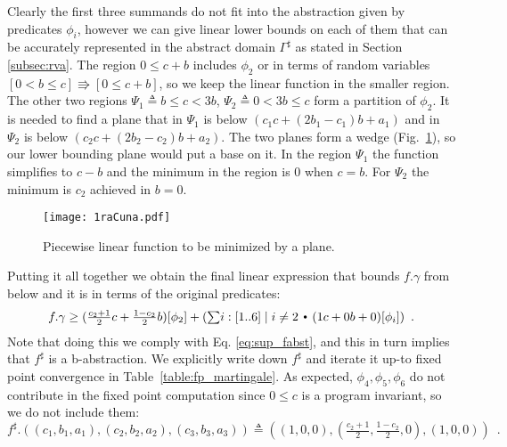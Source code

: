 \documentclass{eptcs}
\theoremstyle{plain}
\theoremstyle{definition}
\newcommand{\Def}{\ensuremath{\triangleq}}
\newcommand{\dotsep}{\mbox{\raisebox{0.4ex}{\tiny\ensuremath{\:\;\bullet\;\:}}}}
\newcommand{\elq}{\ensuremath{\Rrightarrow}}
\begin{document}
Clearly the first three summands do not fit into the abstraction given by predicates $\phi_i$,
however we can give linear lower bounds on each of them that can be accurately represented in the abstract domain $\Gamma^\sharp$ as stated in Section \ref{subsec:rva}.
The region $0\leq c+b$ includes $\phi_2$ or in terms of random variables $[0<b\leq c] \elq [0\leq c+b]$, so we keep the linear function in the smaller region.
The other two regions $\Psi_1 \Def b\leq c<3b$, $\Psi_2 \Def 0<3b\leq c$ form a partition of $\phi_2$.
It is needed to find a plane that in $\Psi_1$ is below $(c_1 c+(2b_1-c_1)b+a_1)$ and in $\Psi_2$ is below $(c_2 c+(2b_2-c_2)b+a_2)$.
The two planes form a wedge (Fig.~\ref{fig:cuna}), so our lower bounding plane would put a base on it.
In the region $\Psi_1$ the function simplifies to $c-b$ and the minimum in the region is $0$ when $c=b$.
For $\Psi_2$ the minimum is $c_2$ achieved in $b=0$.
\begin{figure}[!ht]
\begin{center}
\texttt{[image: 1raCuna.pdf]}
\caption{Piecewise linear function to be minimized by a plane.}
\label{fig:cuna}
\end{center}
\end{figure}
Putting it all together we obtain the final linear expression that bounds $f.\gamma$ from below and it is in terms of the original predicates:
\[ f.\gamma \geq (\tfrac{c_2+1}{2} c + \tfrac{1-c_2}{2} b)[\phi_2] + (\textstyle{\sum} i:[1..6] \mid i\neq 2 \dotsep (1c+0b+0)[\phi_i]) \enspace.\]
Note that doing this we comply with Eq. \ref{eq:sup_fabst}, and this in turn implies that $f^\sharp$ is a \mbox{b-abstraction}.
We explicitly write down $f^\sharp$ and iterate it up-to fixed point convergence in Table~\ref{table:fp_martingale}.
As expected, $\phi_4,\phi_5,\phi_6$ do not contribute in the fixed point computation since $0\leq c$ is a program invariant, so we do not include them:
\[ f^\sharp.((c_1,b_1,a_1),(c_2,b_2,a_2),(c_3,b_3,a_3)) \Def
	((1,0,0),(\tfrac{c_2+1}{2},\tfrac{1-c_2}{2},0),(1,0,0)) \enspace.
\]
\end{document}
